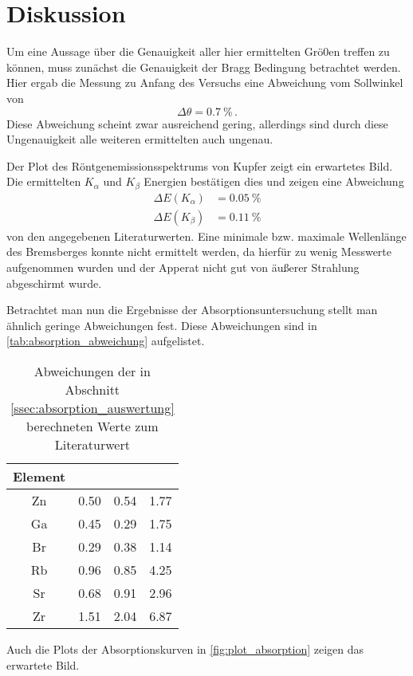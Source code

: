 \section{Diskussion}
\label{sec:Diskussion}

Um eine Aussage über die Genauigkeit aller hier ermittelten Grö0en treffen zu können,
muss zunächst die Genauigkeit der Bragg Bedingung betrachtet werden.
Hier ergab die Messung zu Anfang des Versuchs eine Abweichung vom Sollwinkel von
\begin{equation*}
    \Delta\theta = \SI{0.7}{\percent} \, .
\end{equation*}
Diese Abweichung scheint zwar ausreichend gering, allerdings sind durch diese Ungenauigkeit alle weiteren ermittelten auch ungenau.

Der Plot des Röntgenemissionsspektrums von Kupfer zeigt ein erwartetes Bild.
Die ermittelten $K_\alpha$ und $K_\beta$ Energien bestätigen dies und zeigen eine Abweichung 
\begin{align*}
    \Delta E(K_\alpha) &= \SI{0.05}{\percent} \\
    \Delta E(K_\beta) &= \SI{0.11}{\percent}
\end{align*}
von den angegebenen Literaturwerten.
Eine minimale bzw. maximale Wellenlänge des Bremsberges konnte nicht ermittelt werden, da hierfür zu wenig Messwerte aufgenommen wurden und der Apperat nicht gut von äußerer Strahlung abgeschirmt wurde.


Betrachtet man nun die Ergebnisse der Absorptionsuntersuchung stellt man ähnlich geringe Abweichungen fest.
Diese Abweichungen sind in \autoref{tab:absorption_abweichung} aufgelistet.
\begin{table}
    \centering
    \caption{Abweichungen der in Abschnitt \ref{ssec:absorption_auswertung} berechneten Werte zum Literaturwert}
    \begin{tabular}{c S S S}
        \toprule
        Element &  & \tableSI{\Delta\theta}{\percent} & \tableSI{\Delta\sigma}{\percent} \\
        \midrule
        Zn & 0.50 & 0.54 & 1.77 \\
        Ga & 0.45 & 0.29 & 1.75 \\
        Br & 0.29 & 0.38 & 1.14 \\
        Rb & 0.96 & 0.85 & 4.25 \\
        Sr & 0.68 & 0.91 & 2.96 \\
        Zr & 1.51 & 2.04 & 6.87 \\
        \bottomrule
    \end{tabular}
\end{table}
Auch die Plots der Absorptionskurven in \autoref{fig:plot_absorption} zeigen das erwartete Bild.

